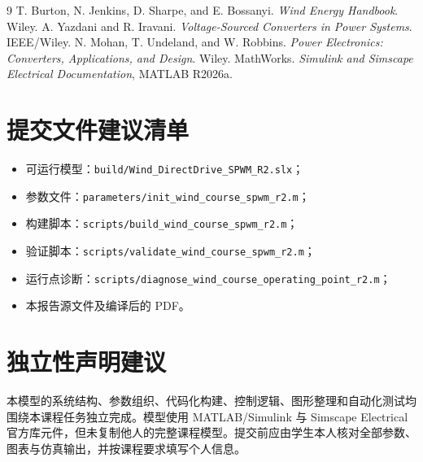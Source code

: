 \documentclass[UTF8,zihao=-4,fontset=fandol]{ctexrep}
\begin{document}
\begin{thebibliography}{9}
 T. Burton, N. Jenkins, D. Sharpe, and E. Bossanyi. \textit{Wind Energy Handbook}. Wiley.
 A. Yazdani and R. Iravani. \textit{Voltage-Sourced Converters in Power Systems}. IEEE/Wiley.
 N. Mohan, T. Undeland, and W. Robbins. \textit{Power Electronics: Converters, Applications, and Design}. Wiley.
 MathWorks. \textit{Simulink and Simscape Electrical Documentation}, MATLAB R2026a.
\end{thebibliography}

\appendix
\chapter{提交文件建议清单}
\begin{itemize}
  \item 可运行模型：\texttt{build/Wind\_DirectDrive\_SPWM\_R2.slx}；
  \item 参数文件：\texttt{parameters/init\_wind\_course\_spwm\_r2.m}；
  \item 构建脚本：\texttt{scripts/build\_wind\_course\_spwm\_r2.m}；
  \item 验证脚本：\texttt{scripts/validate\_wind\_course\_spwm\_r2.m}；
  \item 运行点诊断：\texttt{scripts/diagnose\_wind\_course\_operating\_point\_r2.m}；
  \item 本报告源文件及编译后的 PDF。
\end{itemize}

\chapter{独立性声明建议}
本模型的系统结构、参数组织、代码化构建、控制逻辑、图形整理和自动化测试均围绕本课程任务独立完成。模型使用 MATLAB/Simulink 与 Simscape Electrical 官方库元件，但未复制他人的完整课程模型。提交前应由学生本人核对全部参数、图表与仿真输出，并按课程要求填写个人信息。
\end{document}
